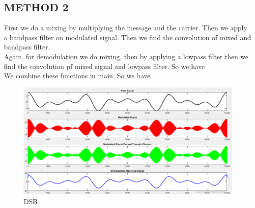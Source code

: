 \documentclass[11pt]{article}
\begin{document}
\begin{question}
\begin{subquestion}
{\section*{METHOD 2}
First we do a mixing by multiplying the message and the carrier. Then we apply a bandpass filter on modulated signal. Then we find the convolution of mixed and bandpass filter.\\

$$$$
Again, for demodulation we do mixing, then by applying a lowpass filter then we find the convolution pf mixed signal and lowpass filter. So we have \\

$$$$
We combine these functions in main. So we have \\

}
\begin{figure}[H]
\centering
\includegraphics[scale=0.6]{Fig/7.png}
\caption{DSB}
\end{figure}
\end{subquestion}




\end{question}
\end{document}
